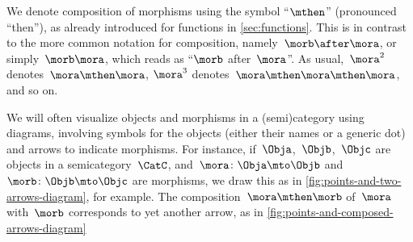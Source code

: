\begin{remark}
    We denote composition of morphisms using the symbol ``$\mthen$'' (pronounced ``then''), as already introduced for functions in \cref{sec:functions}.
    This is in contrast to the more common notation for composition, namely~$\morb\after \mora$, or simply~$\morb \mora$, which reads as ``$\morb$ after~$\mora$''.
    As usual,~$\mora^2$ denotes~$\mora \mthen \mora$, $\mora^3$ denotes~$\mora \mthen \mora \mthen \mora$, and so on.
\end{remark}


\begin{marginfigure}
    \centering
    \caption{}
    \label{fig:points-and-two-arrows-diagram}
\end{marginfigure}

\begin{marginfigure}
    \centering
    \caption{}
    \label{fig:points-and-composed-arrows-diagram}
\end{marginfigure}

We will often visualize objects and morphisms in a (semi)category using diagrams, involving symbols for the objects (either their names or a generic dot) and arrows to indicate morphisms.
For instance, if~$\Obja$,~$\Objb$,~$\Objc$ are objects in a semicategory~$\CatC$, and~$\mora\colon \Obja \mto \Objb$ and~$\morb\colon \Objb \mto \Objc$ are morphisms, we draw this as in \cref{fig:points-and-two-arrows-diagram}, for example.
The composition~$\mora \mthen \morb$ of~$\mora$ with~$\morb$ corresponds to yet another arrow, as in \cref{fig:points-and-composed-arrows-diagram}


